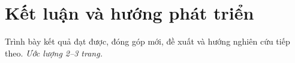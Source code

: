 \chapter{Kết luận và hướng phát triển}\label{ch:ketluan}

\begin{goiy}
Trình bày kết quả đạt được, đóng góp mới, đề xuất và hướng nghiên cứu tiếp theo. \emph{Ước lượng 2--3 trang.}
\end{goiy}




